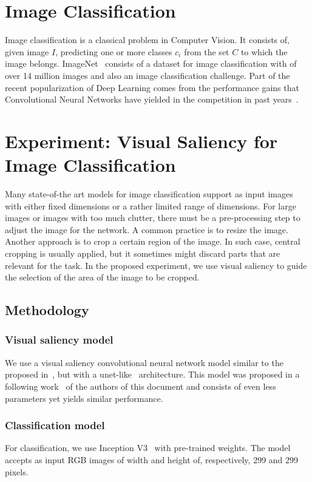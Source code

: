 \documentclass[English]{style/ic-tese-v3}
\begin{document}
\section{Image Classification}
Image classification is a classical problem in Computer Vision.
It consists of, given image $I$, predicting one or more classes
$c_i$ from the set $C$ to which the image belongs.
ImageNet~\cite{ref:imagenet-dset} consists of a dataset for image classification with of over 14 million images
and also an image classification challenge.
Part of the recent popularization of Deep Learning comes from the performance gains that
Convolutional Neural Networks have yielded in the competition
in past years~\cite{ref:imagenet}\cite{ref:inceptionv3}.

\section{Experiment: Visual Saliency for Image Classification}
Many state-of-the art models for image classification support as input images with either fixed dimensions
or a rather limited range of dimensions.
For large images or images with too much clutter, there must be a pre-processing step to
adjust the image for the network.
A common practice is to resize the image.
Another approach is to crop a certain region of the image.
In such case, central cropping is usually applied, but it sometimes might discard parts that
are relevant for the task.
In the proposed experiment, we use visual saliency to guide the selection of the area of the image to
be cropped.

\subsection{Methodology}
\subsubsection{Visual saliency model}
We use a visual saliency convolutional neural network model similar to the proposed in~\cite{ref:erik-esther},
but with a unet-like~\cite{ref:unet} architecture.
This model was proposed in a following work~\cite{ref:ic-erik} of the authors of this document and
consists of even less parameters yet yields similar performance.

\subsubsection{Classification model}
For classification, we use Inception V3~\cite{ref:inceptionv3} with pre-trained weights.
The model accepts as input RGB images of width and height of, respectively, 299 and 299 pixels.
\end{document}
